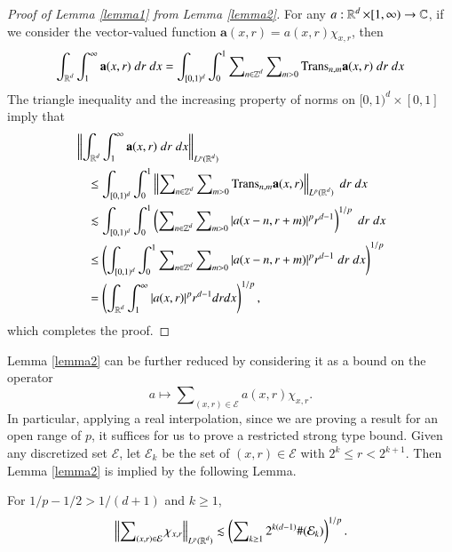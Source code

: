 \begin{proof}[Proof of Lemma \ref{lemma1} from Lemma \ref{lemma2}]
    For any $a: \operatorname{\mathbb{R}}^d \times [1,\infty) \to \operatorname{\mathbb{C}}$, if we consider the vector-valued function $\mathbf{a}(x,r) = a(x,r) \chi_{x,r}$, then
    \begin{equation}
      \int_{\operatorname{\mathbb{R}}^d} \int_1^\infty \mathbf{a}(x,r)\; dr\; dx = \int_{[0,1)^d} \int_0^1 \sum\nolimits_{n \in \operatorname{\mathbb{Z}}^d} \sum\nolimits_{m > 0} \text{Trans}_{n,m} \mathbf{a}(x,r)\; dr\; dx
    \end{equation}
    The triangle inequality and the increasing property of norms on $[0,1)^d \times [0,1]$ imply that
    \begin{equation}
    \begin{split}
    &\left\| \int_{\operatorname{\mathbb{R}}^d} \int_1^\infty \mathbf{a}(x,r)\; dr\; dx \right\|_{L^p(\operatorname{\mathbb{R}}^d)}\\
    &\quad \leq \int_{[0,1)^d} \int_0^1 \left\| \sum\nolimits_{n \in \operatorname{\mathbb{Z}}^d} \sum\nolimits_{m > 0} \text{Trans}_{n,m} \mathbf{a}(x,r) \right\|_{L^p(\operatorname{\mathbb{R}}^d)}\; dr\; dx\\
    &\quad \lesssim \int_{[0,1)^d} \int_0^1 \left( \sum\nolimits_{n \in \operatorname{\mathbb{Z}}^d} \sum\nolimits_{m > 0} |a(x - n, r + m)|^p r^{d-1} \right)^{1/p}\; dr\; dx\\
    &\quad \leq \left( \int_{[0,1)^d} \int_0^1 \sum\nolimits_{n \in \operatorname{\mathbb{Z}}^d} \sum\nolimits_{m > 0} |a(x - n, r + m)|^p r^{d-1}\; dr\; dx \right)^{1/p}\\
    &\quad = \left( \int_{\operatorname{\mathbb{R}}^d} \int_1^\infty |a(x,r)|^p r^{d-1} dr dx \right)^{1/p},
    \end{split}
    \end{equation}
    which completes the proof.
\end{proof}

Lemma \ref{lemma2} can be further reduced by considering it as a bound on the operator
%
\[ a \mapsto \sum\nolimits_{(x,r) \in \mathcal{E}} a(x,r) \chi_{x,r}. \]
%
In particular, applying a real interpolation, since we are proving a result for an open range of $p$, it suffices for us to prove a restricted strong type bound. Given any discretized set $\mathcal{E}$, let $\mathcal{E}_k$ be the set of $(x,r) \in \mathcal{E}$ with $2^k \leq r < 2^{k+1}$. Then Lemma \ref{lemma2} is implied by the following Lemma.

\begin{lemma} \label{lemma3}
    For $1/p - 1/2 > 1/(d+1)$ and $k \geq 1$,
    \[ \left\| \sum\nolimits_{(x,r) \in \mathcal{E}} \chi_{x,r} \right\|_{L^p(\operatorname{\mathbb{R}}^d)} \lesssim \left( \sum\nolimits_{k \geq 1} 2^{k(d-1)} \#(\mathcal{E}_k) \right)^{1/p}. \]
\end{lemma}

